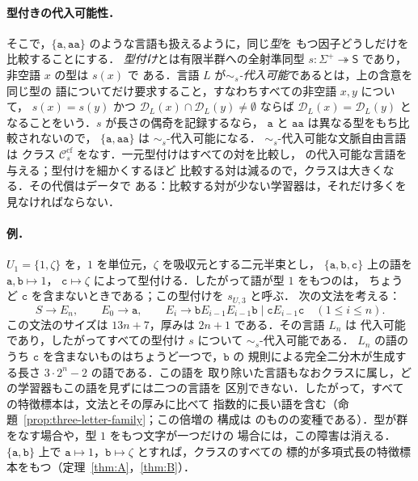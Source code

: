 \documentclass[11pt,a4paper]{ltjsarticle}
\numberwithin{equation}{section}
\theoremstyle{plain}
\theoremstyle{definition}
\theoremstyle{remark}
\theoremstyle{plain}
\newcommand{\cf}{\mathrm{cf}}
\newcommand{\Ccf}[1]{\mathcal C_{#1}^{\cf}}
\newcommand{\D}{\mathcal{D}}
\begin{document}
\paragraph{型付きの代入可能性．}
そこで，$\{\mathtt a,\mathtt{aa}\}$ のような言語も扱えるように，同じ\emph{型}を
もつ因子どうしだけを比較することにする．
\emph{型付け}とは有限半群への全射準同型
$s:\Sigma^+\twoheadrightarrow\mathsf S$ であり，非空語 $x$ の型は $s(x)$ で
ある．言語 $L$ が\emph{$\sim_s$-代入可能}であるとは，上の含意を同じ型の
語についてだけ要求すること，すなわちすべての非空語 $x,y$ について，
$s(x)=s(y)$ かつ $\D_L(x)\cap\D_L(y)\ne\emptyset$ ならば
$\D_L(x)=\D_L(y)$ となることをいう．$s$ が長さの偶奇を記録するなら，
$\mathtt a$ と $\mathtt{aa}$ は異なる型をもち比較されないので，
$\{\mathtt a,\mathtt{aa}\}$ は $\sim_s$-代入可能になる．
$\sim_s$-代入可能な文脈自由言語は
クラス $\Ccf{s}$ をなす．一元型付けはすべての対を比較し，
\cite{ClarkEyraud2007} の代入可能な言語を与える；型付けを細かくするほど
比較する対は減るので，クラスは大きくなる．その代償はデータで
ある：比較する対が少ない学習器は，それだけ多くを見なければならない．

\paragraph{例．}
$U_1=\{1,\zeta\}$ を，$1$ を単位元，$\zeta$ を吸収元とする二元半束とし，
$\{\mathtt a,\mathtt b,\mathtt c\}$ 上の語を $\mathtt a,\mathtt b\mapsto1$，
$\mathtt c\mapsto\zeta$ によって型付ける．したがって語が型 $1$ をもつのは，
ちょうど $\mathtt c$ を含まないときである；この型付けを $s_{U,3}$ と呼ぶ．
次の文法を考える：
\[
 S\to E_n,\qquad E_0\to\mathtt a,\qquad
 E_i\to\mathtt bE_{i-1}E_{i-1}\mathtt b\mid\mathtt cE_{i-1}\mathtt c
 \quad(1\le i\le n).
\]
この文法のサイズは $13n+7$，厚みは $2n+1$ である．その言語 $L_n$ は
代入可能であり，したがってすべての型付け $s$ について $\sim_s$-代入可能である．
$L_n$ の語のうち $\mathtt c$ を含まないものはちょうど一つで，$\mathtt b$ の
規則による完全二分木が生成する長さ $3\cdot2^n-2$ の語である．この語を
取り除いた言語もなおクラスに属し，どの学習器もこの語を見ずには二つの言語を
区別できない．したがって，すべての特徴標本は，文法とその厚みに比べて
指数的に長い語を含む（命題~\ref{prop:three-letter-family}；この倍増の
構成は \cite[命題~6.4]{kuriyamaCFG} のものの変種である）．型が群をなす場合や，型 $1$ をもつ文字が一つだけの
場合には，この障害は消える．$\{\mathtt a,\mathtt b\}$ 上で
$\mathtt a\mapsto1$，$\mathtt b\mapsto\zeta$ とすれば，クラスのすべての
標的が多項式長の特徴標本をもつ（定理~\ref{thm:A}，\ref{thm:B}）．
\end{document}
